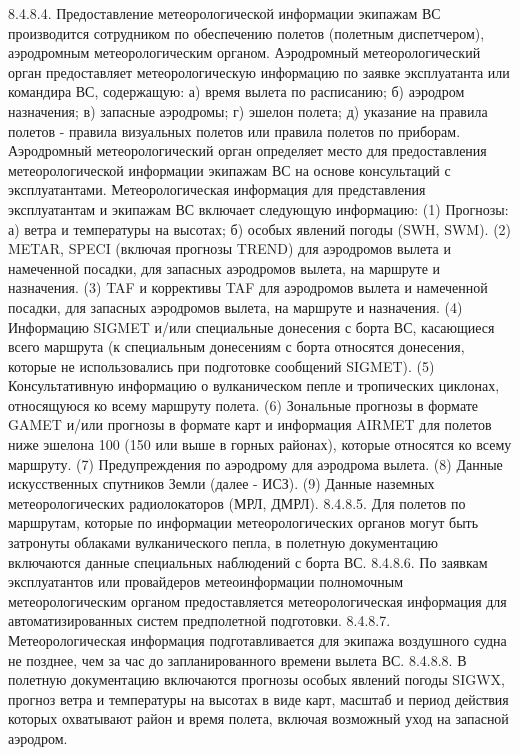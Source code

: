 8.4.8.4. Предоставление метеорологической информации экипажам ВС производится сотрудником по обеспечению полетов (полетным диспетчером), аэродромным метеорологическим органом.
Аэродромный метеорологический орган предоставляет метеорологическую информацию по заявке эксплуатанта или командира ВС, содержащую: 
а)	время вылета по расписанию; 
б)	аэродром назначения; 
в)	запасные аэродромы; 
г)	эшелон полета; 
д)	указание на правила полетов - правила визуальных полетов или правила полетов по приборам. 
Аэродромный метеорологический орган определяет место для предоставления метеорологической информации экипажам ВС на основе консультаций с эксплуатантами.
Метеорологическая информация для представления эксплуатантам и экипажам ВС включает следующую информацию: 
(1) Прогнозы: 
а)	ветра и температуры на высотах; 
б)	особых явлений погоды (SWH, SWM). 
(2) METAR, SPECI (включая прогнозы TREND) для аэродромов вылета и намеченной посадки, для запасных аэродромов вылета, на маршруте и назначения.
(3) TAF и коррективы TAF для аэродромов вылета и намеченной посадки, для запасных аэродромов вылета, на маршруте и назначения. 
(4) Информацию SIGMET и/или специальные донесения с борта ВС, касающиеся всего маршрута (к специальным донесениям с борта относятся донесения, которые не использовались при подготовке сообщений SIGMET). 
(5) Консультативную информацию о вулканическом пепле и тропических циклонах, относящуюся ко всему маршруту полета.
(6) Зональные прогнозы в формате GAMET и/или прогнозы в формате карт и информация AIRMET для полетов ниже эшелона 100 (150 или выше в горных районах), которые относятся ко всему маршруту. 
(7) Предупреждения по аэродрому для аэродрома вылета. 
(8) Данные искусственных спутников Земли (далее - ИСЗ). 
(9) Данные наземных метеорологических радиолокаторов (МРЛ, ДМРЛ).
8.4.8.5. Для полетов по маршрутам, которые по информации метеорологических органов могут быть затронуты облаками вулканического пепла, в полетную документацию включаются данные специальных наблюдений с борта ВС.
8.4.8.6. По заявкам эксплуатантов или провайдеров метеоинформации полномочным метеорологическим органом предоставляется метеорологическая информация для автоматизированных систем предполетной подготовки.
8.4.8.7. Метеорологическая информация подготавливается для экипажа воздушного судна не позднее, чем за час до запланированного времени вылета ВС.
8.4.8.8. В полетную документацию включаются прогнозы особых явлений погоды SIGWX, прогноз ветра и температуры на высотах в виде карт, масштаб и период действия которых охватывают район и время полета, включая возможный уход на запасной аэродром.
